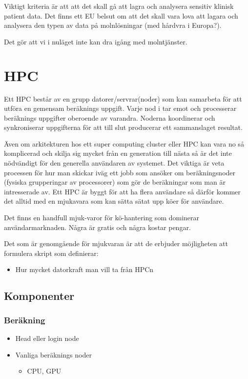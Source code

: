 \documentclass[
  letterpaper,
  DIV=11,
  numbers=noendperiod]{scrreprt}
\providecommand{\tightlist}{%
  \setlength{\itemsep}{0pt}\setlength{\parskip}{0pt}}\usepackage{longtable,booktabs,array}
\begin{document}
Viktigt kriteria är att att det skall gå att lagra och analysera
sensitiv klinisk patient data. Det finns ett EU belsut om att det skall
vara lova att lagara och analysera den typen av data på molnlösningar
(med hårdvra i Europa?).

Det gör att vi i nuläget inte kan dra igång med molntjänster.

\section{HPC}\label{hpc-1}

Ett HPC består av en grupp datorer/servrar(noder) som kan samarbeta för
att utföra en gemensam beräknings uppgift. Varje nod i tar emot och
processerar beräknings uppgifter oberoende av varandra. Noderna
koordinerar och synkroniserar uppgifterna för att till slut producerar
ett sammanslaget resultat.

Även om arkitekturen hos ett super computing cluster eller HPC kan vara
no så komplicerad och skilja sig mycket från en generation till nästa så
är det inte nödvändigt för den generella användaren av systemet. Det
viktiga är veta processen för hur man skickar iväg ett jobb som ansöker
om beräkningsnoder (fysiska grupperingar av processorer) som gör de
beräkningar som man är intresserade av. Ett HPC är byggt för att ha
flera användare så därför kommer det alltid med en mjukavara som kan
sätta sätat upp köer för användare.

Det finns en handfull mjuk-varor för kö-hantering som dominerar
användarmarknaden. Några är gratis och några kostar pengar.

Det som är genomgående för mjukvaran är att de erbjuder möjligheten att
formulera skript som definierar:

\begin{itemize}
\tightlist
\item
  Hur mycket datorkraft man vill ta från HPCn
\end{itemize}

\subsection{Komponenter}\label{komponenter}

\subsubsection{Beräkning}\label{beruxe4kning}

\begin{itemize}
\item
  Head eller login node
\item
  Vanliga beräknings noder

  \begin{itemize}
  \tightlist
  \item
    CPU, GPU
  \end{itemize}
\end{itemize}
\end{document}
